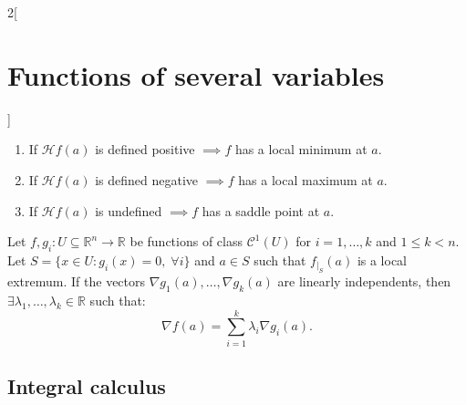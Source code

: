 \documentclass[class=article,10pt,crop=false]{standalone}
\begin{document}
\begin{multicols}{2}[\section{Functions of several variables}]
\begin{theorem}
\begin{enumerate}
    \item If $\mathcal{H}f(a)$ is defined positive $\implies f$ has a local minimum at $a$.
    \item If $\mathcal{H}f(a)$ is defined negative $\implies f$ has a local maximum at $a$.
    \item If $\mathcal{H}f(a)$ is undefined $\implies f$ has a saddle point at $a$.
\end{enumerate}
\end{theorem}
\begin{theorem}
Let $f,g_i:U\subseteq\mathbb{R}^n\rightarrow\mathbb{R}$ be functions of class $\mathcal{C}^1(U)$ for $i=1,\ldots,k$ and $1\leq k<n$. Let $S=\{x\in U:g_i(x)=0,\;\forall i\}$ and $a\in S$ such that $f_{|_S}(a)$ is a local extremum. If the vectors $\nabla g_1(a),\ldots,\nabla g_k(a)$ are linearly independents, then $\exists\lambda_1,\ldots,\lambda_k\in\mathbb{R}$ such that: $$\nabla f(a)=\sum_{i=1}^k\lambda_i\nabla g_i(a).$$
\end{theorem}
\subsection{Integral calculus}

\end{multicols}
\end{document}
